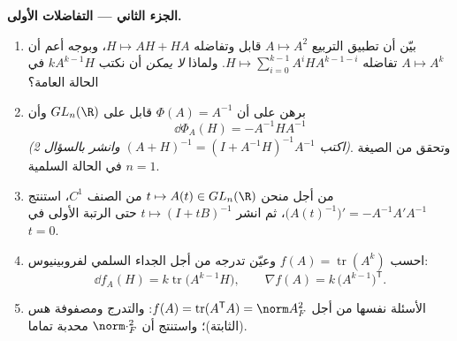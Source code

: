 \begin{problem}
\medskip
\noindent\textbf{الجزء الثاني --- التفاضلات الأولى.}
\begin{enumerate}[resume]
  \item بيّن أن تطبيق التربيع $A \mapsto A^2$ قابل  وتفاضله $H \mapsto AH + HA$،
        وبوجه أعم أن $A \mapsto A^k$ تفاضله $H \mapsto \sum_{i=0}^{k-1}
        A^iHA^{k-1-i}$. ولماذا \emph{لا يمكن} أن نكتب
        $kA^{k-1}H$ في الحالة العامة؟
  \item برهن على أن $\Phi(A) = A^{-1}$ قابل  على $GL_n(\R)$ وأن
        \[
        \dd\Phi_A(H) = -A^{-1}HA^{-1}
        \]
        \emph{(اكتب $(A + H)^{-1} = (I + A^{-1}H)^{-1}A^{-1}$ وانشر بالسؤال 2)}. وتحقق من الصيغة في
        الحالة السلمية $n = 1$.
  \item من أجل منحن $t \mapsto A(t) \in GL_n(\R)$ من الصنف $C^1$، استنتج $\bigl(A(t)^{-1}\bigr)' = -A^{-1}A'A^{-1}$، ثم انشر
        $t \mapsto (I + tB)^{-1}$ حتى الرتبة الأولى في $t = 0$.
  \item احسب  $f(A) =
        \operatorname{tr}(A^k)$ وعيّن تدرجه من أجل الجداء السلمي
        لفروبينيوس:
        \[
        \dd f_A(H) = k\operatorname{tr}\bigl(A^{k-1}H\bigr),
        \qquad
        \nabla f(A) = k\,\bigl(A^{k-1}\bigr)^{\mathsf T} .
        \]
  \item الأسئلة نفسها من أجل $f(A) = \operatorname{tr}
        (A^{\mathsf T}A) = \norm A_F^2$:  والتدرج ومصفوفة هس
        (الثابتة)؛ واستنتج أن $\norm\cdot_F^2$ محدبة تماما.
\end{enumerate}


\end{problem}
